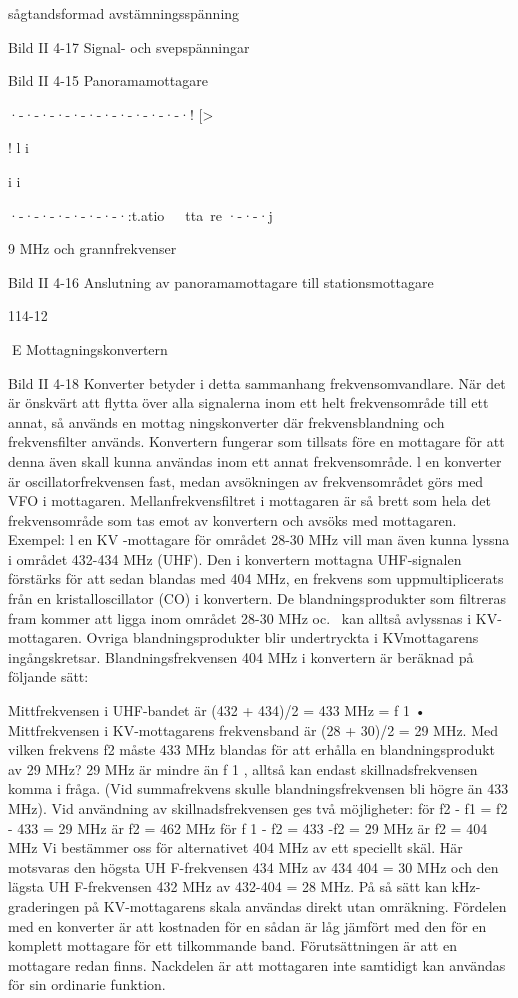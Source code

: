 \documentclass[a4paper,twoside,twocolumn,openright]{book}
\begin{document}
{{{sågtandsformad avstämningsspänning

Bild II 4-17 Signal- och svepspänningar

Bild II 4-15 Panoramamottagare

·-·-·-·-·-·-·-·-·-·-·-·!
[>

!
l
i

i
i

·-·-·-·-·-·-·-·:t.atio~~~tta~re ·-·-·j

9 MHz och
grannfrekvenser

Bild II 4-16 Anslutning av panoramamottagare till stationsmottagare

114-12

E
Mottagningskonvertern

Bild II 4-18
Konverter betyder i detta sammanhang frekvensomvandlare. När det är önskvärt att
flytta över alla signalerna inom ett helt frekvensområde till ett annat, så används en
mottag ningskonverter där frekvensblandning och frekvensfilter används.
Konvertern fungerar som tillsats före en
mottagare för att denna även skall kunna
användas inom ett annat frekvensområde. l
en konverter är oscillatorfrekvensen fast,
medan avsökningen av frekvensområdet
görs med VFO i mottagaren. Mellanfrekvensfiltret i mottagaren är så brett som hela
det frekvensområde som tas emot av konvertern och avsöks med mottagaren.
Exempel: l en KV -mottagare för området
28-30 MHz vill man även kunna lyssna i
området 432-434 MHz (UHF). Den i konvertern mottagna UHF-signalen förstärks för
att sedan blandas med 404 MHz, en frekvens som uppmultiplicerats från en kristalloscillator (CO) i konvertern. De blandningsprodukter som filtreras fram kommer att
ligga inom området 28-30 MHz oc.~ kan
alltså avlyssnas i KV-mottagaren. Ovriga
blandningsprodukter blir undertryckta i KVmottagarens ingångskretsar.
Blandningsfrekvensen 404 MHz i konvertern är beräknad på följande sätt:

Mittfrekvensen i UHF-bandet är
(432 + 434)/2 = 433 MHz = f 1 •
Mittfrekvensen i KV-mottagarens frekvensband är (28 + 30)/2 = 29 MHz.
Med vilken frekvens f2 måste 433 MHz
blandas för att erhålla en blandningsprodukt
av 29 MHz? 29 MHz är mindre än f 1 , alltså
kan endast skillnadsfrekvensen komma i
fråga. (Vid summafrekvens skulle blandningsfrekvensen bli högre än 433 MHz).
Vid användning av skillnadsfrekvensen
ges två möjligheter:
för f2 - f1 = f2 - 433 = 29 MHz är f2 = 462 MHz
för f 1 - f2 = 433 -f2 = 29 MHz är f2 = 404 MHz
Vi bestämmer oss för alternativet 404
MHz av ett speciellt skäl. Här motsvaras den
högsta UH F-frekvensen 434 MHz av 434 404 = 30 MHz och den lägsta UH F-frekvensen 432 MHz av 432-404 = 28 MHz. På så
sätt kan kHz-graderingen på KV-mottagarens skala användas direkt utan omräkning.
Fördelen med en konverter är att kostnaden för en sådan är låg jämfört med den
för en komplett mottagare för ett tilkommande
band. Förutsättningen är att en mottagare
redan finns.
Nackdelen är att mottagaren inte samtidigt kan användas för sin ordinarie funktion.

}}}
\end{document}
